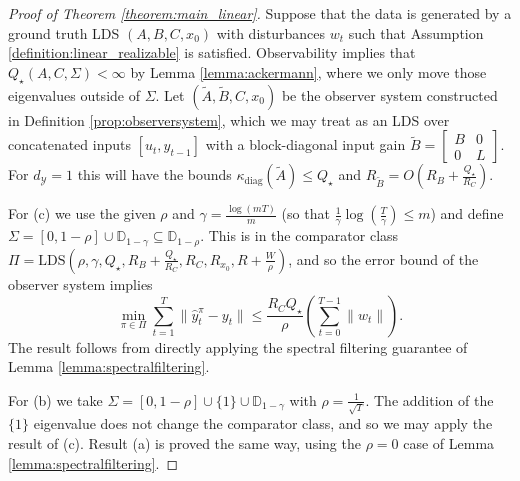 \documentclass[11pt]{article}
\renewcommand{\subset}{\subseteq}
\newcommand{\norm}[1]{\left\lVert#1\right\rVert}
\newtheorem{lemma}[theorem]{Lemma}
\numberwithin{equation}{section}
\begin{document}


\begin{proof}[Proof of Theorem \ref{theorem:main_linear}]
    Suppose that the data is generated by a ground truth LDS $(A, B, C, x_0)$ with disturbances $w_t$ such that Assumption \ref{definition:linear_realizable} is satisfied. Observability implies that $Q_\star(A, C, \Sigma) < \infty$ by Lemma \ref{lemma:ackermann}, where we only move those eigenvalues outside of $\Sigma$.
    Let $(\tilde{A}, \tilde{B}, C, x_0)$ be the observer system constructed in Definition \ref{prop:observersystem}, which we may treat as an LDS over concatenated inputs $[u_t, y_{t-1}]$ with a block-diagonal input gain $\tilde{B} = \begin{bmatrix}
        B & 0 \\ 0 & L
    \end{bmatrix}$. For $d_\mathcal{Y}=1$ this will have the bounds $\kappa_{\operatorname{diag}}(\tilde{A}) \leq Q_\star$ and $R_{\tilde{B}} = O(R_B + \frac{Q_\star}{R_C})$.
    
    For (c) we use the given $\rho$ and $\gamma = \frac{\log(mT)}{m}$ (so that $\frac{1}{\gamma} \log(\frac{T}{\gamma}) \leq m$) and define $\Sigma = [0, 1-\rho] \cup \mathbb{D}_{1-\gamma} \subset \mathbb{D}_{1-\rho}$. This is in the comparator class $\Pi = \mathrm{LDS}\left(\rho, \gamma, Q_\star, R_B + \frac{Q_\star}{R_C}, R_C, R_{x_0}, R + \frac{W}{\rho}\right)$, and so the error bound of the observer system implies
    $$\min_{\pi \in \Pi}\sum_{t=1}^T \|\hat{y}_t^\pi - y_t\| \leq \frac{R_CQ_\star}{\rho} \left( \sum_{t=0}^{T-1} \|w_t\|\right).$$
    The result follows from directly applying the spectral filtering guarantee of Lemma \ref{lemma:spectralfiltering}.

    For (b) we take $\Sigma = [0, 1 - \rho] \cup \{1\} \cup \mathbb{D}_{1-\gamma}$ with $\rho = \frac{1}{\sqrt{T}}$. The addition of the $\{1\}$ eigenvalue does not change the comparator class, and so we may apply the result of (c). Result (a) is proved the same way, using the $\rho = 0$ case of Lemma \ref{lemma:spectralfiltering}.
\end{proof}
\end{document}
